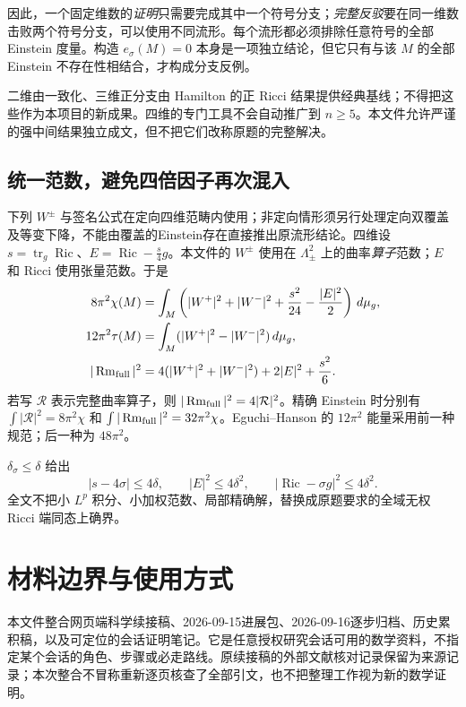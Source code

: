 \documentclass[UTF8,a4paper,11pt,fontset=fandol]{ctexart}
\numberwithin{equation}{section}
\theoremstyle{definition}
\newcommand{\Ric}{\operatorname{Ric}}
\newcommand{\Rm}{\operatorname{Rm}}
\newcommand{\tr}{\operatorname{tr}}
\newcommand{\dd}{\,d\mu_g}
\begin{document}
因此，一个固定维数的\emph{证明}只需要完成其中一个符号分支；\emph{完整反驳}要在同一维数击败两个符号分支，可以使用不同流形。每个流形都必须排除任意符号的全部 Einstein 度量。构造 $e_\sigma(M)=0$ 本身是一项独立结论，但它只有与该 $M$ 的全部 Einstein 不存在性相结合，才构成分支反例。

二维由一致化、三维正分支由 Hamilton 的正 Ricci 结果提供经典基线；不得把这些作为本项目的新成果。四维的专门工具不会自动推广到 $n\ge5$。本文件允许严谨的强中间结果独立成文，但不把它们改称原题的完整解决。

\subsection{统一范数，避免四倍因子再次混入}
下列 $W^\pm$ 与签名公式在定向四维范畴内使用；非定向情形须另行处理定向双覆盖及等变下降，不能由覆盖的Einstein存在直接推出原流形结论。四维设 $s=\tr_g\Ric$、$E=\Ric-\frac{s}{4}g$。本文件的 $W^\pm$ 使用在 $\Lambda^2_\pm$ 上的曲率\emph{算子}范数；$E$ 和 Ricci 使用张量范数。于是
\begin{align}
8\pi^2\chi(M)&=\int_M\left(|W^+|^2+|W^-|^2+\frac{s^2}{24}-\frac{|E|^2}{2}\right)\dd,\label{eq:CGB}\\
12\pi^2\tau(M)&=\int_M(|W^+|^2-|W^-|^2)\dd,\label{eq:signature}\\
|\Rm_{\rm full}|^2&=4(|W^+|^2+|W^-|^2)+2|E|^2+\frac{s^2}{6}.
\end{align}
若写 $\mathcal R$ 表示完整曲率算子，则 $|\Rm_{\rm full}|^2=4|\mathcal R|^2$。精确 Einstein 时分别有 $\int|\mathcal R|^2=8\pi^2\chi$ 和 $\int|\Rm_{\rm full}|^2=32\pi^2\chi$。Eguchi--Hanson 的 $12\pi^2$ 能量采用前一种规范；后一种为 $48\pi^2$。

$\delta_\sigma\le\delta$ 给出
\begin{equation}
 |s-4\sigma|\le4\delta,\qquad |E|^2\le4\delta^2,\qquad
 |\Ric-\sigma g|^2\le4\delta^2.
\end{equation}
全文不把小 $L^p$ 积分、小加权范数、局部精确解，替换成原题要求的全域无权 Ricci 端同态上确界。

\section{材料边界与使用方式}
本文件整合网页端科学续接稿、2026-09-15进展包、2026-09-16逐步归档、历史累积稿，以及可定位的会话证明笔记。它是任意授权研究会话可用的数学资料，不指定某个会话的角色、步骤或必走路线。原续接稿的外部文献核对记录保留为来源记录；本次整合不冒称重新逐页核查了全部引文，也不把整理工作视为新的数学证明。
\end{document}
